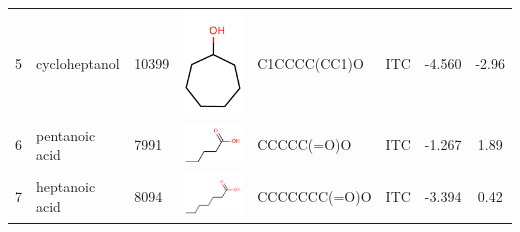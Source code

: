 \documentclass[aps,pre,twocolumn,nofootinbib,superscriptaddress,10pt, final,tightenlines]{revtex4-1}
\begin{document}
\begin{table}
\begin{tabular}{lllp{2cm}>{\ttfamily}llS[table-format=-1.3, table-figures-uncertainty=1]S[table-format=-1.2, table-figures-uncertainty=1]}
5    & cycloheptanol               & 10399    & \parbox[c]{1em}{\includegraphics[scale=0.2]{figures/10399.pdf}}  & C1CCCC(CC1)O            & ITC    & -4.560   & -2.96  \\
6    & pentanoic acid              & 7991     & \parbox[c]{1em}{\includegraphics[scale=0.2]{figures/7991.pdf}}   & CCCCC(=O)O              & ITC    & -1.267   &  1.89  \\
7    & heptanoic acid              & 8094     & \parbox[c]{1em}{\includegraphics[scale=0.2]{figures/8094.pdf}}   & CCCCCCC(=O)O            & ITC    & -3.394   &  0.42  \\

\end{tabular}
\end{table}
\end{document}
